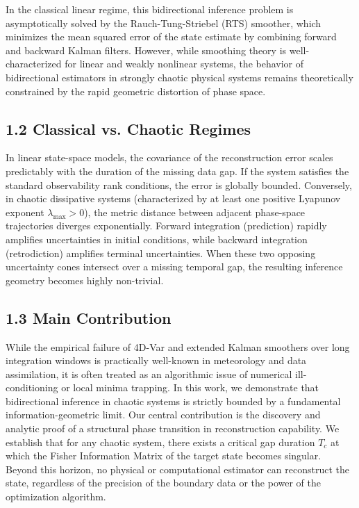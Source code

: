 \documentclass[aps,prl,reprint,superscriptaddress,nofootinbib]{revtex4-2}
\begin{document}
In the classical linear regime, this bidirectional inference problem is asymptotically solved by the Rauch-Tung-Striebel (RTS) smoother, which minimizes the mean squared error of the state estimate by combining forward and backward Kalman filters. However, while smoothing theory is well-characterized for linear and weakly nonlinear systems, the behavior of bidirectional estimators in strongly chaotic physical systems remains theoretically constrained by the rapid geometric distortion of phase space.

\subsection{1.2 Classical vs. Chaotic Regimes}
In linear state-space models, the covariance of the reconstruction error scales predictably with the duration of the missing data gap. If the system satisfies the standard observability rank conditions, the error is globally bounded. Conversely, in chaotic dissipative systems (characterized by at least one positive Lyapunov exponent $\lambda_{\max} > 0$), the metric distance between adjacent phase-space trajectories diverges exponentially. Forward integration (prediction) rapidly amplifies uncertainties in initial conditions, while backward integration (retrodiction) amplifies terminal uncertainties. When these two opposing uncertainty cones intersect over a missing temporal gap, the resulting inference geometry becomes highly non-trivial.

\subsection{1.3 Main Contribution}
While the empirical failure of 4D-Var and extended Kalman smoothers over long integration windows is practically well-known in meteorology and data assimilation, it is often treated as an algorithmic issue of numerical ill-conditioning or local minima trapping. In this work, we demonstrate that bidirectional inference in chaotic systems is strictly bounded by a fundamental information-geometric limit. Our central contribution is the discovery and analytic proof of a structural phase transition in reconstruction capability. We establish that for any chaotic system, there exists a critical gap duration $T_c$ at which the Fisher Information Matrix of the target state becomes singular. Beyond this horizon, no physical or computational estimator can reconstruct the state, regardless of the precision of the boundary data or the power of the optimization algorithm.
\end{document}

